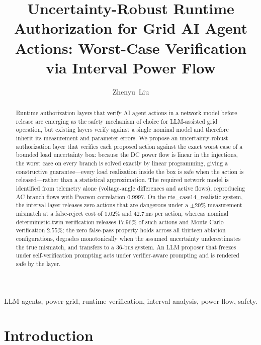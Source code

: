 \documentclass[journal]{IEEEtran}
\begin{document}
\title{Uncertainty-Robust Runtime Authorization for Grid AI Agent Actions: Worst-Case Verification via Interval Power Flow}

\author{Zhenyu~Liu%
}

\maketitle

\begin{abstract}
Runtime authorization layers that verify AI agent actions in a network model
before release are emerging as the safety mechanism of choice for LLM-assisted
grid operation, but existing layers verify against a single nominal model and
therefore inherit its measurement and parameter errors. We propose an
uncertainty-robust authorization layer that verifies each proposed action
against the exact worst case of a bounded load uncertainty box: because the DC
power flow is linear in the injections, the worst case on every branch is
solved exactly by linear programming, giving a constructive guarantee---every
load realization inside the box is safe when the action is released---rather
than a statistical approximation. The required network model is identified
from telemetry alone (voltage-angle differences and active flows), reproducing
AC branch flows with Pearson correlation $0.9997$. On the
rte\_case14\_realistic system, the interval layer releases zero actions that
are dangerous under a $\pm 20\%$ measurement mismatch at a false-reject cost
of $1.02\%$ and $42.7$\,ms per action, whereas nominal deterministic-twin
verification releases $17.96\%$ of such actions and Monte Carlo verification
$2.55\%$; the zero false-pass property holds across all thirteen ablation
configurations, degrades monotonically when the assumed uncertainty
underestimates the true mismatch, and transfers to a 36-bus system. An LLM
proposer that freezes under self-verification prompting acts under
verifier-aware prompting and is rendered safe by the layer.
\end{abstract}

\begin{IEEEkeywords}
LLM agents, power grid, runtime verification, interval analysis, power flow,
safety.
\end{IEEEkeywords}

\section{Introduction}
\label{sec:intro}
\end{document}
